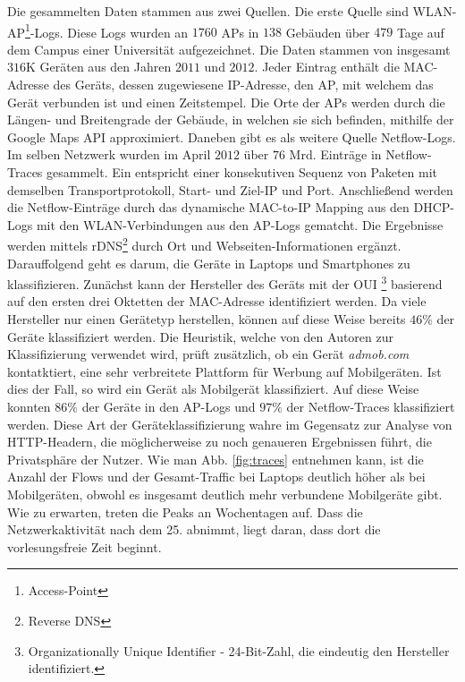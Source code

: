 \documentclass[12pt, a4paper]{article}
\begin{document}
Die gesammelten Daten stammen aus zwei Quellen. Die erste Quelle sind WLAN-AP\footnote{Access-Point}-Logs. 
Diese Logs wurden an $1760$ APs in $138$ Gebäuden über $479$ Tage auf dem
Campus einer Universität aufgezeichnet. Die Daten stammen von insgesamt $316$\textsc{K} Geräten aus den Jahren $2011$ und $2012$.
Jeder Eintrag enthält die MAC-Adresse des Geräts, dessen zugewiesene IP-Adresse, den AP, mit welchem das Gerät verbunden ist
und einen Zeitstempel.
Die Orte der APs werden durch die Längen- und Breitengrade der Gebäude, in welchen sie sich befinden, mithilfe der Google Maps API
approximiert. Daneben gibt es als weitere Quelle Netflow-Logs. Im selben Netzwerk wurden im April $2012$ über $76$ Mrd.
Einträge in Netflow-Traces gesammelt. Ein  entspricht einer konsekutiven Sequenz von Paketen mit demselben
Transportprotokoll, Start- und Ziel-IP und Port. \cite{Alipour2018}
Anschließend werden die Netflow-Einträge durch das dynamische MAC-to-IP Mapping aus den DHCP-Logs mit den WLAN-Verbindungen aus den AP-Logs gematcht. Die Ergebnisse werden mittels rDNS\footnote{Reverse DNS} durch Ort und Webseiten-Informationen ergänzt. \cite{Alipour2018}
Darauffolgend geht es darum, die Geräte in Laptops und Smartphones zu klassifizieren.
Zunächst kann der Hersteller des Geräts mit der OUI \footnote{Organizationally Unique Identifier - 24-Bit-Zahl, 
die eindeutig den Hersteller identifiziert.} basierend auf den ersten drei Oktetten der MAC-Adresse identifiziert werden.
Da viele Hersteller nur einen Gerätetyp herstellen, können auf diese Weise bereits
$46 \%$ der Geräte klassifiziert werden. Die Heuristik, welche von den Autoren zur Klassifizierung verwendet wird,
prüft zusätzlich, ob ein Gerät \textit{admob.com} kontatktiert, eine sehr verbreitete Plattform für Werbung auf Mobilgeräten.
Ist dies der Fall, so wird ein Gerät als Mobilgerät klassifiziert. Auf diese Weise konnten $86 \%$ der Geräte in den AP-Logs
und $97 \%$ der Netflow-Traces klassifiziert werden. Diese Art der Geräteklassifizierung wahre im Gegensatz zur Analyse von 
HTTP-Headern, die möglicherweise zu noch genaueren Ergebnissen führt, die Privatsphäre der Nutzer.\newline
Wie man Abb. \ref{fig:traces} entnehmen kann, ist die Anzahl der Flows und der
Gesamt-Traffic bei Laptops deutlich höher als bei Mobilgeräten, obwohl es insgesamt deutlich mehr verbundene Mobilgeräte gibt.
Wie zu erwarten, treten die Peaks an Wochentagen auf. Dass die Netzwerkaktivität nach dem 25. abnimmt, liegt daran, dass dort
die vorlesungsfreie Zeit beginnt.
\end{document}
